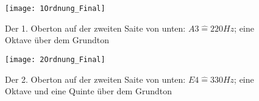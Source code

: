 \begin{figure}[!h]
		\centering
		\texttt{[image: 1Ordnung\_Final]}
		\caption{Der 1. Oberton auf der zweiten Saite von unten: $A3 \widehat{=} 220Hz$; eine Oktave über dem Grundton}
		\label{fig:ersteroberton}
\end{figure}

\begin{figure}[!h]
		\centering
		\texttt{[image: 2Ordnung\_Final]}
		\caption{Der 2. Oberton auf der zweiten Saite von unten: $E4 \widehat{=} 330Hz$; eine Oktave und eine Quinte über dem Grundton}
		\label{fig:zweiteroberton}
\end{figure}


